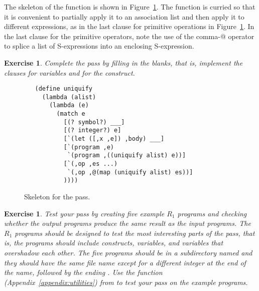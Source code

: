 \documentclass[11pt]{book}
\newtheorem{exercise}[theorem]{Exercise}
\begin{document}
The skeleton of the  function is shown in
Figure~\ref{fig:uniquify-s0}.  The function is curried so that it is
convenient to partially apply it to an association list and then apply
it to different expressions, as in the last clause for primitive
operations in Figure~\ref{fig:uniquify-s0}. In the last 
clause for the primitive operators, note the use of the comma-@
operator to splice a list of S-expressions into an enclosing
S-expression.

\begin{exercise}
\normalfont %

Complete the  pass by filling in the blanks, that is,
implement the clauses for variables and for the  construct.
\end{exercise}

\begin{figure}[tbp]
\begin{lstlisting}
   (define uniquify
     (lambda (alist)
       (lambda (e)
         (match e
           [(? symbol?) ___]
           [(? integer?) e]
           [`(let ([,x ,e]) ,body) ___]
           [`(program ,e)
            `(program ,((uniquify alist) e))]
           [`(,op ,es ...)
            `(,op ,@(map (uniquify alist) es))]
           ))))
\end{lstlisting}
\caption{Skeleton for the  pass.}
\label{fig:uniquify-s0}
\end{figure}

\begin{exercise}
\normalfont %

Test your  pass by creating five example $R_1$ programs
and checking whether the output programs produce the same result as
the input programs. The $R_1$ programs should be designed to test the
most interesting parts of the  pass, that is, the
programs should include  constructs, variables, and variables
that overshadow each other.  The five programs should be in a
subdirectory named  and they should have the same file name
except for a different integer at the end of the name, followed by the
ending .  Use the  function
(Appendix~\ref{appendix:utilities}) from  to test
your  pass on the example programs.

\end{exercise}
\end{document}
